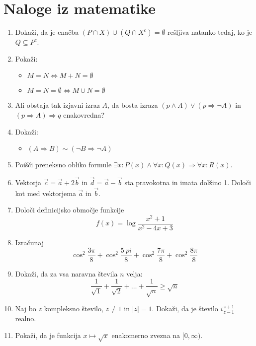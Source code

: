 \documentclass[a4paper,12pt]{article}
\begin{document}
\section*{Naloge iz matematike}

\begin{enumerate}    
\item Dokaži, da je enačba $(P\cap X)\cup (Q\cap X^c)=\emptyset$
rešljiva natanko tedaj, ko je $Q\subseteq P^c$.

\item Pokaži:
\begin{itemize}
\item $M=N\iff M+N=\emptyset$
\item $M=N=\emptyset \iff M\cup N = \emptyset$
\end{itemize}

\item Ali obstaja tak izjavni izraz $A$, da bosta izraza
$(p\wedge A)\vee (p\Rightarrow \neg A)$ in $(p \Rightarrow A)\Rightarrow q$ enakovredna?

\item Dokaži:
\begin{itemize}
    \item $(A \Rightarrow B) \sim (\neg B \Rightarrow \neg A)$
\end{itemize}

\item Poišči preneksno obliko formule $\exists x : P(x) \wedge \forall x: Q(x) \Rightarrow \forall x : R(x)$.

\item Vektorja $\vec{c} = \vec{a} + 2\vec{b} $ in $\vec{d} = \vec{a}-\vec{b}$
sta pravokotna in imata dolžino 1. Določi kot med vektorjema $\vec{a}$ in $\vec{b}$.

\item Določi definicijsko območje funkcije
%
\[
f(x) = \log \frac{x^2+1}{x^2-4x+3}   
\]
%
\item Izračunaj
%
\[
\cos ^2 \frac{3\pi}{8} + \cos ^2 \frac{5~pi}{8}+\cos ^2 \frac{7\pi}{8}+\cos ^2 \frac{8\pi}{8}  
\]
%
\item Dokaži, da za vsa naravna števila $n$ velja:
%
\[
\frac{1}{\sqrt{1}}+\frac{1}{\sqrt{2}}+\ldots+\frac{1}{\sqrt{n}} \ge \sqrt{n}   
\]
%
\item Naj bo $z$ kompleksno število, $z \neq 1$ in $|z|=1$.
Dokaži, da je število $i\frac{z+1}{z-1}$ realno.

\item Pokaži, da je funkcija $x \mapsto \sqrt{x}$ enakomerno zvezna na $[0,\infty)$.


\end{enumerate}
\end{document}
